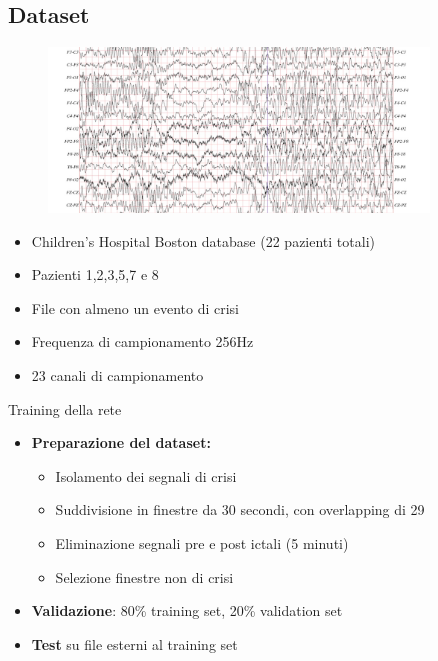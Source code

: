 \documentclass[xcolor=x11names,compress, 
					handout %
]{beamer}
\theoremstyle{definition} \newtheorem{esempio}{Esempio}
\theoremstyle{definition}
\begin{document}
	\subsection{Dataset}
		\begin{frame}{\subsecname}
			\begin{figure}
				\includegraphics[width=0.9\textwidth]{immagini/chb}
			\end{figure}
			\begin{itemize}
				\item Children's Hospital Boston database (22 pazienti totali)
				\item Pazienti 1,2,3,5,7 e 8
				\item File con almeno un evento di crisi
				\item Frequenza di campionamento 256Hz
				\item 23 canali di campionamento
			\end{itemize}
		\end{frame}
		\begin{frame}{Training della rete}
			\begin{itemize}
				\item\textbf{Preparazione del dataset:}
				\begin{itemize}
					\item Isolamento dei segnali di crisi
					\item Suddivisione in finestre da 30 secondi, con overlapping di 29
					\item Eliminazione segnali pre e post ictali (5 minuti)
					\item Selezione finestre non di crisi
				\end{itemize}
				\item\textbf{Validazione}: 80\% training set, 20\% validation set\\
				\item\textbf{Test} su file esterni al training set
			\end{itemize}
		\end{frame}
\end{document}
